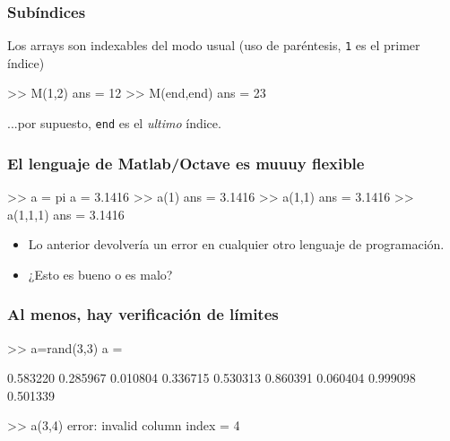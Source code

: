 
\hypertarget{sub-ndices}{}
\begin{frame}[containsverbatim]\frametitle{Subíndices}

  Los arrays son indexables del modo usual (uso de paréntesis, \texttt{1} es el primer índice)
\begin{Octave}
  >> M(1,2) 
  ans = 12
  >> M(end,end) 
  ans = 23
\end{Octave}

\small
\vfill\hfill ...por supuesto, \texttt{end} es el \emph{ultimo} índice.
\end{frame}



\begin{frame}[containsverbatim]
\frametitle{El lenguaje de Matlab/Octave es muuuy flexible}
\begin{Octave}
  >> a = pi 
  a = 3.1416
  >> a(1) 
  ans = 3.1416
  >> a(1,1) 
  ans = 3.1416
  >> a(1,1,1) 
  ans = 3.1416
\end{Octave}
\begin{itemize}
\item {} 
Lo anterior devolvería un error en cualquier otro lenguaje de programación.

\item {} 
¿Esto es bueno o es malo?

\end{itemize}

\end{frame}


\begin{frame}[containsverbatim]
\frametitle{Al menos, hay verificación de límites}
\begin{Octave}
  >> a=rand(3,3) 
  a = 
 
    0.583220   0.285967   0.010804 
    0.336715   0.530313   0.860391 
    0.060404   0.999098   0.501339 
 
    >> a(3,4) 
    error: invalid column index = 4
\end{Octave}
  
\end{frame}


